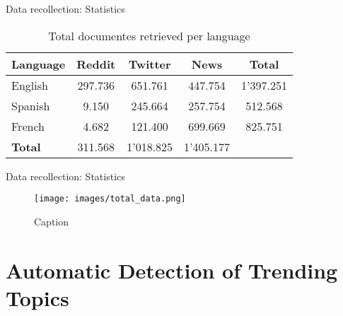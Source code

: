 \documentclass[aspectratio=169]{beamer}
\begin{document}
\begin{frame}{Data recollection: Statistics}
    \begin{table}[]
    \centering
    \caption{Total documentes retrieved per language}
    \label{tab:my-table}
    \begin{tabular}{lcccc}
    \hline
    \textbf{Language} & \textbf{Reddit} & \textbf{Twitter} & \textbf{News} & \textbf{Total}\\ \hline
    English           & 297.736   & 651.761          & 447.754          & 1'397.251 \\ \hline
    Spanish           & 9.150     & 245.664          & 257.754          & 512.568\\ \hline
    French            & 4.682     & 121.400          & 699.669          & 825.751    \\ \hline
    \textbf{Total}  & 311.568   & 1'018.825         & 1'405.177 \\ \hline
    \end{tabular}
    \end{table}
    
\end{frame}

\begin{frame}{Data recollection: Statistics}
    \begin{figure}
        \centering
        \texttt{[image: images/total\_data.png]}
        \caption{Caption}
        \label{fig:my_label}
    \end{figure}
\end{frame}

\section{Automatic Detection of Trending Topics}
\end{document}
